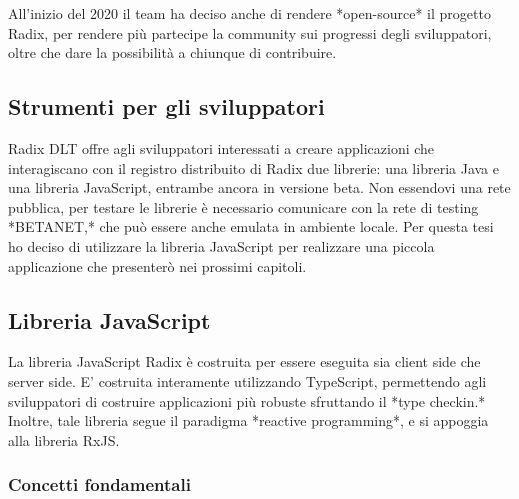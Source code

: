 All'inizio del 2020 il team ha deciso anche di rendere *open-source* il progetto Radix, per rendere più partecipe la community sui progressi degli sviluppatori, oltre che dare la possibilità a chiunque di contribuire.

\subsection{Strumenti per gli sviluppatori}

Radix DLT offre agli sviluppatori interessati a creare applicazioni che interagiscano con il registro distribuito di Radix due librerie: una libreria Java e una libreria JavaScript, entrambe ancora in versione beta. Non essendovi una rete pubblica, per testare le librerie è necessario comunicare con la rete di testing *BETANET,* che può essere anche emulata in ambiente locale. Per questa tesi ho deciso di utilizzare la libreria JavaScript per realizzare una piccola applicazione che presenterò nei prossimi capitoli.

\subsection{Libreria JavaScript}

La libreria JavaScript Radix è costruita per essere eseguita sia client side che server side. E' costruita interamente utilizzando TypeScript, permettendo agli sviluppatori di costruire applicazioni più robuste sfruttando il *type checkin.* Inoltre, tale libreria segue il paradigma *reactive programming*, e si appoggia alla libreria RxJS.

\subsubsection{Concetti fondamentali}

